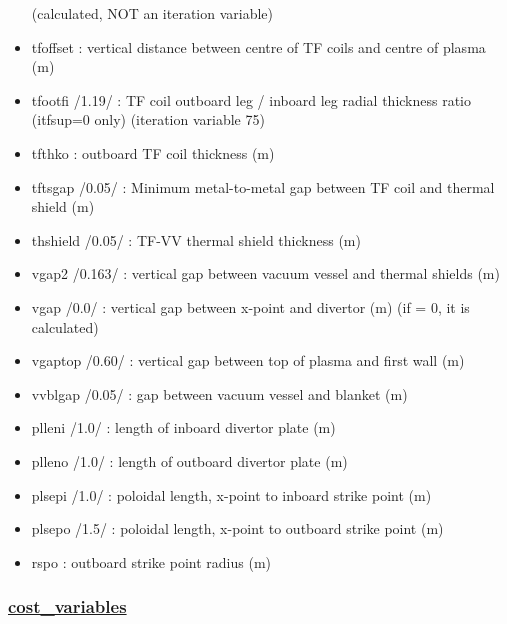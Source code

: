 \documentclass[]{article}
\begin{document}
\begin{itemize}
  (calculated, NOT an iteration variable)
\item
  tfoffset : vertical distance between centre of TF coils and centre of
  plasma (m)
\item
  tfootfi /1.19/ : TF coil outboard leg / inboard leg radial thickness
  ratio (itfsup=0 only) (iteration variable 75)
\item
  tfthko : outboard TF coil thickness (m)
\item
  tftsgap /0.05/ : Minimum metal-to-metal gap between TF coil and
  thermal shield (m)
\item
  thshield /0.05/ : TF-VV thermal shield thickness (m)
\item
  vgap2 /0.163/ : vertical gap between vacuum vessel and thermal shields
  (m)
\item
  vgap /0.0/ : vertical gap between x-point and divertor (m) (if = 0, it
  is calculated)
\item
  vgaptop /0.60/ : vertical gap between top of plasma and first wall (m)
\item
  vvblgap /0.05/ : gap between vacuum vessel and blanket (m)
\item
  plleni /1.0/ : length of inboard divertor plate (m)
\item
  plleno /1.0/ : length of outboard divertor plate (m)
\item
  plsepi /1.0/ : poloidal length, x-point to inboard strike point (m)
\item
  plsepo /1.5/ : poloidal length, x-point to outboard strike point (m)
\item
  rspo : outboard strike point radius (m)
\end{itemize}

\hypertarget{cost_variables}{%
\subsubsection{\texorpdfstring{\href{cost_variables.html}{cost\_variables}}{cost\_variables}}\label{cost_variables}}
\end{document}
